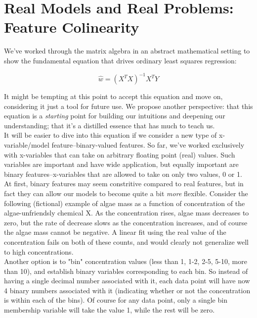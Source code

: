 \section{Real Models and Real Problems: Feature Colinearity}

We've worked through the matrix algebra in an abstract mathematical setting to show the fundamental equation that drives ordinary least squares regression:

\begin{equation}
\hat{w} = (X^T X)^{-1} X^T Y
\end{equation}

It might be tempting at this point to accept this equation and move on, considering it just a tool for future use.  We propose another perspective: that this equation is a \emph{starting} point for building our intuitions and deepening our understanding; that it's a distilled essence that has much to teach us. \\

It will be easier to dive into this equation if we consider a new type of x-variable/model feature--binary-valued features.  
So far, we've worked exclusively with x-variables that can take on arbitrary floating point (real) values.  
Such variables are important and have wide application, but equally important are binary features--x-variables that are allowed to take on only two values, 0 or 1.\\

At first, binary features may seem constritive compared to real features, but in fact they can allow our models to become quite a bit \emph{more} flexible.  Consider the following (fictional) example of algae mass as a function of concentration of the algae-unfriendsly chemical X.  As the concentration rises, algae mass decreases to zero, but the rate of decrease slows as the concentration increases, and of course the algae mass cannot be negative.  A linear fit using the real value of the concentration fails on both of these counts, and would clearly not generalize well to high concentrations.\\

Another option is to "bin" concentration values (less than 1, 1-2, 2-5, 5-10, more than 10), and establish binary variables corresponding to each bin.  So instead of having a single decimal number associated with it, each data point will have now 4 binary numbers associated with it (indicating whether or not the concentration is within each of the bins).  Of course for any data point, only a single bin membership variable will take the value 1, while the rest will be zero. \\

